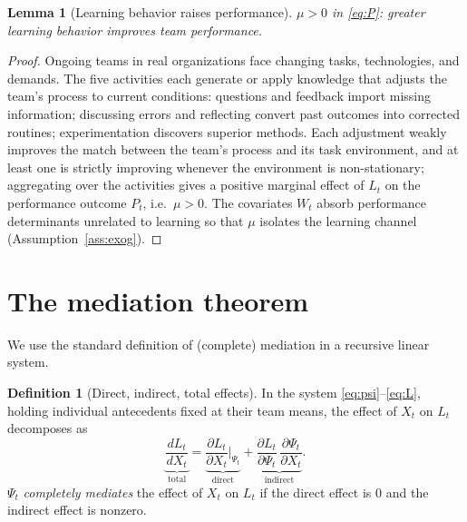 \documentclass{amsart}
\newtheorem{lemma}{Lemma}
\theoremstyle{definition}
\newtheorem{definition}{Definition}
\theoremstyle{remark}
\begin{document}
\begin{lemma}[Learning behavior raises performance]\label{lem:perf}
$\mu>0$ in \eqref{eq:P}: greater learning behavior improves team
performance.
\end{lemma}

\begin{proof}
Ongoing teams in real organizations face changing tasks, technologies, and
demands. The five activities each generate or apply knowledge that adjusts
the team's process to current conditions: questions and feedback import
missing information; discussing errors and reflecting convert past
outcomes into corrected routines; experimentation discovers superior
methods. Each adjustment weakly improves the match between the team's
process and its task environment, and at least one is strictly improving
whenever the environment is non-stationary; aggregating over the
activities gives a positive marginal effect of $L_t$ on the performance
outcome $P_t$, i.e.\ $\mu>0$. The covariates $W_t$ absorb performance
determinants unrelated to learning so that $\mu$ isolates the
learning channel (Assumption~\ref{ass:exog}).
\end{proof}

\section{The mediation theorem}

We use the standard definition of (complete) mediation in a recursive
linear system.

\begin{definition}[Direct, indirect, total effects]\label{def:effects}
In the system \eqref{eq:psi}--\eqref{eq:L}, holding individual antecedents
fixed at their team means, the effect of $X_t$ on $L_t$ decomposes as
\[
\underbrace{\frac{dL_t}{dX_t}}_{\text{total}}
=\underbrace{\frac{\partial L_t}{\partial X_t}\Big|_{\Psi_t}}_{\text{direct}}
+\underbrace{\frac{\partial L_t}{\partial \Psi_t}\,\frac{\partial \Psi_t}{\partial X_t}}_{\text{indirect}} .
\]
$\Psi_t$ \emph{completely mediates} the effect of $X_t$ on $L_t$ if the
direct effect is $0$ and the indirect effect is nonzero.
\end{definition}
\end{document}
